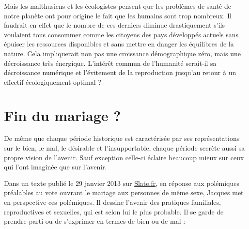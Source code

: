  Mais les malthusiens et les écologistes pensent que les problèmes de santé de notre planète ont pour origine le fait que les humains sont trop nombreux. Il faudrait en effet que le nombre de ces derniers diminue drastiquement s'ils voulaient tous consommer comme les citoyens des pays développés actuels sans épuiser les ressources disponibles et sans mettre en danger les équilibres de la nature. Cela impliquerait non pas une croissance démographique zéro, mais une décroissance très énergique. L'intérêt commun de l'humanité serait-il sa décroissance numérique et l'évitement de la reproduction jusqu'au retour à un effectif écologiquement optimal ? 
 
 
 \chapter{Fin du mariage ?}

 De même que chaque période historique est caractérisée par ses représentations sur le bien, le mal, le désirable et l'insupportable, chaque période secrète aussi sa propre vision de l'avenir. Sauf exception celle-ci éclaire beaucoup mieux sur ceux qui l'ont imaginée que sur l'avenir. 
 
 Dans un texte publié le 29 janvier 2013 sur \href{http://www.slate.fr}{Slate.fr}, en réponse aux polémiques préalables au vote ouvrant le mariage aux personnes de même sexe, Jacques  met en perspective ces polémiques. Il dessine l'avenir des pratiques familiales, reproductives et sexuelles, qui est selon lui le plus probable. Il se garde de prendre parti ou de s'exprimer en termes de bien ou de mal  : 

